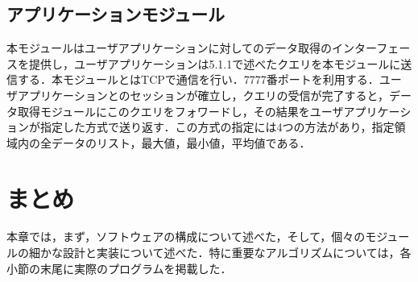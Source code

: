 \subsection{アプリケーションモジュール}
本モジュールはユーザアプリケーションに対してのデータ取得のインターフェースを提供し，ユーザアプリケーションは5.1.1で述べたクエリを本モジュールに送信する．本モジュールとはTCPで通信を行い．7777番ポートを利用する．ユーザアプリケーションとのセッションが確立し，クエリの受信が完了すると，データ取得モジュールにこのクエリをフォワードし，その結果をユーザアプリケーションが指定した方式で送り返す．この方式の指定には4つの方法があり，指定領域内の全データのリスト，最大値，最小値，平均値である．


\section{まとめ}
本章では，まず，ソフトウェアの構成について述べた，そして，個々のモジュールの細かな設計と実装について述べた．特に重要なアルゴリズムについては，各小節の末尾に実際のプログラムを掲載した．